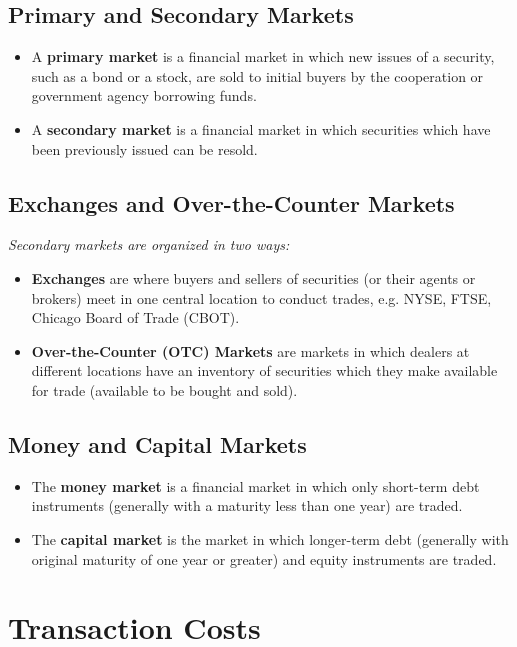 \subsection{Primary and Secondary Markets}
\begin{itemize}
    \item A \textbf{primary market} is a financial market in which new issues of a security, such as a bond or a stock, are sold to initial buyers by the cooperation or government agency borrowing funds.
    \item A \textbf{secondary market} is a financial market in which securities which have been previously issued can be resold.
\end{itemize}

\subsection{Exchanges and Over-the-Counter Markets}
\textit{Secondary markets are organized in two ways:}
\begin{itemize}
    \item \textbf{Exchanges} are where buyers and sellers of securities (or their agents or brokers) meet in one central location to conduct trades, e.g. NYSE, FTSE, Chicago Board of Trade (CBOT).
    \item \textbf{Over-the-Counter (OTC) Markets} are markets in which dealers at different locations have an inventory of securities which they make available for trade (available to be bought and sold).
\end{itemize}

\subsection{Money and Capital Markets}
\begin{itemize}
    \item The \textbf{money market} is a financial market in which only short-term debt instruments (generally with a maturity less than one year) are traded.
    \item The \textbf{capital market} is the market in which longer-term debt (generally with original maturity of one year or greater) and equity instruments are traded.
\end{itemize}

\section{Transaction Costs}


